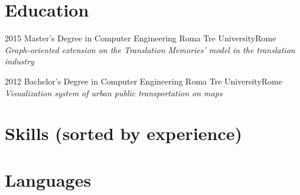 \documentclass[11pt,a4paper,sans]{moderncv} %
\begin{document}

\section{Education}

\cventry
{2015}
{Master's Degree in Computer Engineering}
{Roma Tre University}{Rome}
{}
{\emph{\normalsize {Graph-oriented extension on the Translation Memories' model in the translation industry}}}

\cventry
{2012}
{Bachelor's Degree in Computer Engineering}
{Roma Tre University}{Rome}
{}
{\emph{\normalsize {Visualization system of urban public transportation on maps}}}


\section{Skills (sorted by experience)}



\section{Languages}

\end{document}
